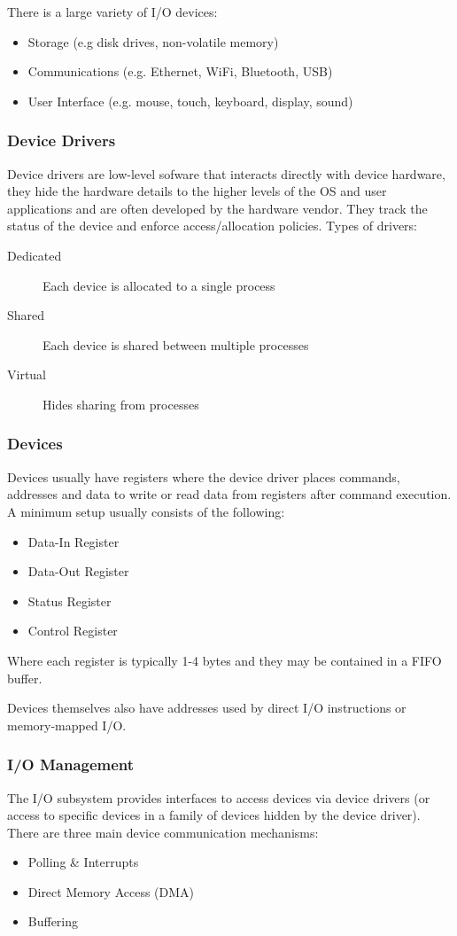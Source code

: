 \documentclass{article}%
\begin{document}
There is a large variety of I/O devices:
\begin{itemize}
\item Storage (e.g disk drives, non-volatile memory)
\item Communications (e.g. Ethernet, WiFi, Bluetooth, USB)
\item User Interface (e.g. mouse, touch, keyboard, display, sound)
\end{itemize}

\subsubsection{Device Drivers}
\label{sec:orgaf691dc}
Device drivers are low-level sofware that interacts directly with device hardware, they hide the hardware details to the higher levels of the OS and user applications and are often developed by the hardware vendor.
They track the status of the device and enforce access/allocation policies.
Types of drivers:
\begin{description}
\item[{Dedicated}] Each device is allocated to a single process
\item[{Shared}] Each device is shared between multiple processes
\item[{Virtual}] Hides sharing from processes
\end{description}
\subsubsection{Devices}
\label{sec:org5bb3dbe}
Devices usually have registers where the device driver places commands, addresses and data to write or read data from registers after command execution.
A minimum setup usually consists of the following:
\begin{itemize}
\item Data-In Register
\item Data-Out Register
\item Status Register
\item Control Register
\end{itemize}
Where each register is typically 1-4 bytes and they may be contained in a FIFO buffer.

Devices themselves also have addresses used by direct I/O instructions or memory-mapped I/O.

\subsubsection{I/O Management}
\label{sec:orgfc8e422}
The I/O subsystem provides interfaces to access devices via device drivers (or access to specific devices in a family of devices hidden by the device driver).
There are three main device communication mechanisms:
\begin{itemize}
\item Polling \& Interrupts
\item Direct Memory Access (DMA)
\item Buffering
\end{itemize}
\end{document}
